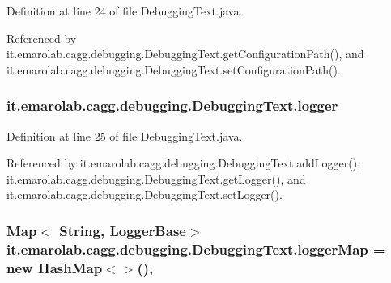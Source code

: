 Definition at line 24 of file Debugging\-Text.\-java.



Referenced by it.\-emarolab.\-cagg.\-debugging.\-Debugging\-Text.\-get\-Configuration\-Path(), and it.\-emarolab.\-cagg.\-debugging.\-Debugging\-Text.\-set\-Configuration\-Path().

\hypertarget{classit_1_1emarolab_1_1cagg_1_1debugging_1_1DebuggingText_aa7afec4cc4e3688d720b5ee81a59aa0e}{
\subsubsection[{logger}]{ it.\-emarolab.\-cagg.\-debugging.\-Debugging\-Text.\-logger\hspace{0.3cm}{\ttfamily [private]}}}\label{classit_1_1emarolab_1_1cagg_1_1debugging_1_1DebuggingText_aa7afec4cc4e3688d720b5ee81a59aa0e}


Definition at line 25 of file Debugging\-Text.\-java.



Referenced by it.\-emarolab.\-cagg.\-debugging.\-Debugging\-Text.\-add\-Logger(), it.\-emarolab.\-cagg.\-debugging.\-Debugging\-Text.\-get\-Logger(), and it.\-emarolab.\-cagg.\-debugging.\-Debugging\-Text.\-set\-Logger().

\hypertarget{classit_1_1emarolab_1_1cagg_1_1debugging_1_1DebuggingText_a975b5abd8066a5867cd1a21e4b69b2ba}{
\subsubsection[{logger\-Map}]{\setlength{\rightskip}{0pt plus 5cm}Map$<$ String, {\bf Logger\-Base}$>$ it.\-emarolab.\-cagg.\-debugging.\-Debugging\-Text.\-logger\-Map = new Hash\-Map$<$$>$()\hspace{0.3cm}{\ttfamily [static]}, {\ttfamily [private]}}}\label{classit_1_1emarolab_1_1cagg_1_1debugging_1_1DebuggingText_a975b5abd8066a5867cd1a21e4b69b2ba}


